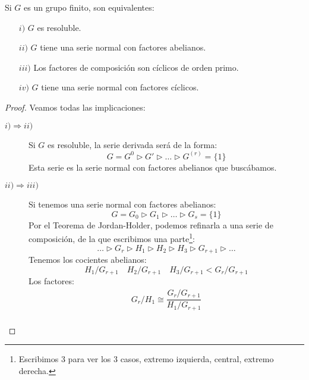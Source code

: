 \begin{teo}
    Si $G$ es un grupo finito, son equivalentes:
    \begin{enumerate}
        \item[$i)$] $G$ es resoluble.
        \item[$ii)$] $G$ tiene una serie normal con factores abelianos.
        \item[$iii)$] Los factores de composición son cíclicos de orden primo.
        \item[$iv)$] $G$ tiene una serie normal con factores cíclicos.
    \end{enumerate}
    \begin{proof}
        Veamos todas las implicaciones:
        \begin{description}
            \item [$i) \Longrightarrow ii)$] Si $G$ es resoluble, la serie derivada será de la forma:
                \begin{equation*}
                    G = G^0 \rhd G' \rhd \ldots \rhd G^{(r)} = \{1\}
                \end{equation*}
                Esta serie es la serie normal con factores abelianos que buscábamos.
            \item [$ii) \Longrightarrow iii)$] Si tenemos una serie normal con factores abelianos:
                \begin{equation*}
                    G = G_0 \rhd G_1 \rhd  \ldots \rhd G_{s} = \{1\}
                \end{equation*}
                Por el Teorema de Jordan-Holder, podemos refinarla a una serie de composición, de la que escribimos una parte\footnote{Escribimos 3 para ver los 3 casos, extremo izquierda, central, extremo derecha.}:
                \begin{equation*}
                    \ldots \rhd G_{r} \rhd H_1 \rhd H_2 \rhd H_3 \rhd G_{r+1} \rhd \ldots
                \end{equation*}
                Tenemos los cocientes abelianos:
                \begin{equation*}
                    H_1/G_{r+1} \quad H_2/G_{r+1} \quad H_3/G_{r+1} < G_r/G_{r+1}
                \end{equation*}
                Los factores:
                \begin{gather*}
                    G_r/H_1 \cong \dfrac{G_r/G_{r+1}}{H_1/G_{r+1}} \\

\end{gather*}
\end{description}
\end{proof}
\end{teo}
